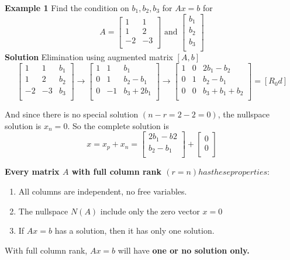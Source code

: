 \textbf{Example 1}
Find the condition on \(b_1, b_2, b_3\) for \(Ax = b\) for 
\[
    A = 
    \begin{bmatrix}
        1 & 1  \\
        1 & 2  \\
        -2 & -3  \\
    \end{bmatrix}
    \text{ and }
    \begin{bmatrix}
         b_1 \\
         b_2 \\
         b_3 \\
    \end{bmatrix}
\]   
\textbf{Solution} Elimination using augmented matrix \([A, b]\)
\[
    \begin{bmatrix}
        1 & 1 & b_1  \\
        1 & 2 & b_2  \\
        -2 & -3 & b_3  \\
    \end{bmatrix}
    \rightarrow
    \begin{bmatrix}
        1 & 1 & b_1  \\
        0 & 1 & b_2 - b_1  \\
        0 & -1 & b_3 + 2b_1  \\
    \end{bmatrix}
    \rightarrow
    \begin{bmatrix}
        1 & 0 & 2b_{1} - b_2  \\
        0 & 1 & b_2 - b_1  \\
        0 & 0 & b_3 + b_1 + b_2  \\
    \end{bmatrix}
    = 
    [R_0 d ]
\] 

And since there is no special solution \((n - r = 2 - 2 = 0)\), the nullspace solution is \(x_n = 0\). So the complete solution is 
\[
    x = x_p + x_n = 
    \begin{bmatrix}
         2b_1 - b2 \\
         b_2 - b_1 \\
    \end{bmatrix}
    + 
    \begin{bmatrix}
         0 \\
         0 \\
    \end{bmatrix}
\]  

\textbf{Every matrix \(A\) with full column rank \((r = n) has these properties:\)  }
\begin{enumerate}
    \item All columns are independent, no free variables. 
    \item The nullspace \(N(A)\) include only the zero vector \(x = 0\)
    \item If \(Ax = b\) has a solution, then it has only one solution.    
\end{enumerate} 
With full column rank, \(Ax = b\) will have \textbf{one or no solution only.}

